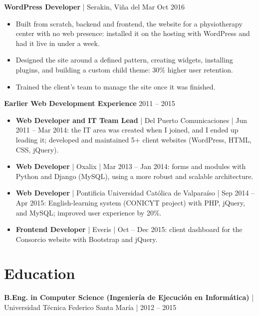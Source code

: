 \documentclass[10pt,letterpaper]{article}
\newcommand{\cvjob}[3]{%
  \vspace{5pt}%
  \textbf{#1} | #2 \hfill #3\par\vspace{1pt}}
\begin{document}
\cvjob{WordPress Developer}{Serakin, Viña del Mar}{Oct 2016}
\begin{itemize}
  \item Built from scratch, backend and frontend, the website for a physiotherapy center with no web presence: installed it on the hosting with WordPress and had it live in under a week.
  \item Designed the site around a defined pattern, creating widgets, installing plugins, and building a custom child theme: 30\% higher user retention.
  \item Trained the client's team to manage the site once it was finished.
\end{itemize}

\vspace{5pt}\textbf{Earlier Web Development Experience} \hfill 2011 -- 2015\par\vspace{1pt}
\begin{itemize}
  \item \textbf{Web Developer and IT Team Lead} | Del Puerto Comunicaciones | Jun 2011 -- Mar 2014: the IT area was created when I joined, and I ended up leading it; developed and maintained 5+ client websites (WordPress, HTML, CSS, jQuery).
  \item \textbf{Web Developer} | Oxalix | Mar 2013 -- Jan 2014: forms and modules with Python and Django (MySQL), using a more robust and scalable architecture.
  \item \textbf{Web Developer} | Pontificia Universidad Católica de Valparaíso | Sep 2014 -- Apr 2015: English-learning system (CONICYT project) with PHP, jQuery, and MySQL; improved user experience by 20\%.
  \item \textbf{Frontend Developer} | Everis | Oct -- Dec 2015: client dashboard for the Consorcio website with Bootstrap and jQuery.
\end{itemize}

\section{Education}
\textbf{B.Eng. in Computer Science (Ingeniería de Ejecución en Informática)} | Universidad Técnica Federico Santa María | 2012 -- 2015

\end{document}
